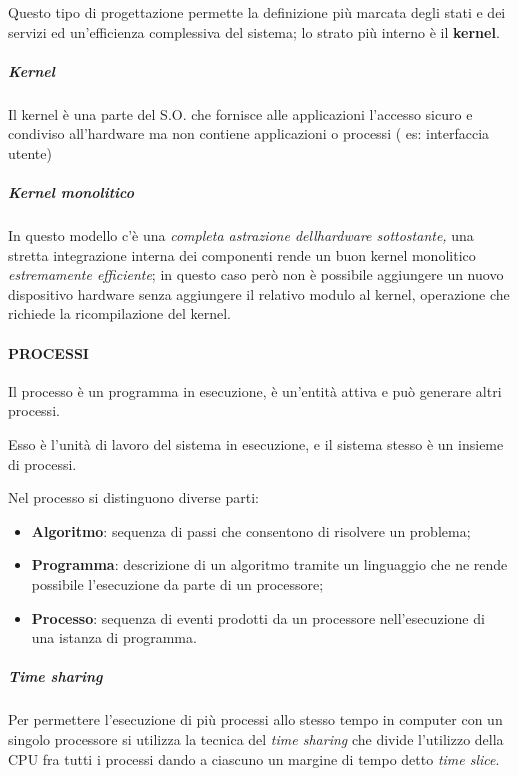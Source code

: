 Questo tipo di progettazione permette la definizione più marcata degli
stati e dei servizi ed un'efficienza complessiva del sistema; lo strato
più interno è il \textbf{kernel}.

\subparagraph{\texorpdfstring{\emph{Kernel}}{Kernel}}\label{kernel}

Il kernel è una parte del S.O. che fornisce alle applicazioni l'accesso
sicuro e condiviso all'hardware ma non contiene applicazioni o processi
( es: interfaccia utente)

\subparagraph{\texorpdfstring{\emph{Kernel
monolitico}}{Kernel monolitico}}\label{kernel-monolitico}

In questo modello c'è una \emph{completa astrazione
dell\textquotesingle hardware sottostante,} una stretta integrazione
interna dei componenti rende un buon kernel monolitico
\emph{estremamente efficiente}; in questo caso però non è possibile
aggiungere un nuovo dispositivo hardware senza aggiungere il relativo
modulo al kernel, operazione che richiede la ricompilazione del kernel.

\paragraph{PROCESSI}\label{processi}

Il processo è un programma in esecuzione, è un'entità attiva e può
generare altri processi.

Esso è l'unità di lavoro del sistema in esecuzione, e il sistema stesso
è un insieme di processi.

Nel processo si distinguono diverse parti:

\begin{itemize}
\item
  \textbf{Algoritmo}: sequenza di passi che consentono di risolvere un
  problema;
\item
  \textbf{Programma}: descrizione di un algoritmo tramite un linguaggio
  che ne rende possibile l'esecuzione da parte di un processore;
\item
  \textbf{Processo}: sequenza di eventi prodotti da un processore
  nell'esecuzione di una istanza di programma.
\end{itemize}

\subparagraph{\texorpdfstring{\emph{Time
sharing}}{Time sharing}}\label{time-sharing}

Per permettere l'esecuzione di più processi allo stesso tempo in
computer con un singolo processore si utilizza la tecnica del \emph{time
sharing} che divide l'utilizzo della CPU fra tutti i processi dando a
ciascuno un margine di tempo detto \emph{time slice}.

